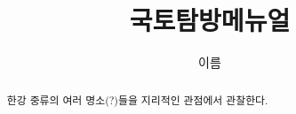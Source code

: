 \documentclass[chapter, oneside]{oblivoir}
\title{국토탐방메뉴얼}
\author{이름}
\begin{document}
    \maketitle
    \begin{abstract}
    한강 중류의 여러 명소(?)들을 지리적인 관점에서 관찰한다.
    \end{abstract}
    \newpage
    \tableofcontents
    
    
\end{document}
